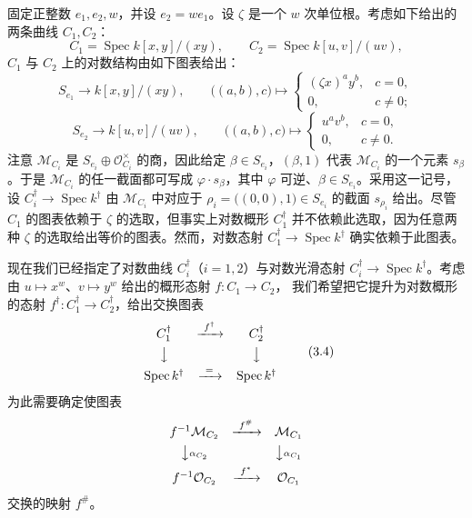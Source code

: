 \begin{example}
固定正整数 $e_1,e_2,w$，并设 $e_2=we_1$。设 $\zeta$ 是一个 $w$ 次单位根。考虑如下给出的两条曲线 $C_1,C_2$：
\[
  C_1=\operatorname{Spec} k[x,y]/(xy),\qquad
  C_2=\operatorname{Spec} k[u,v]/(uv),
\]
$C_1$ 与 $C_2$ 上的对数结构由如下图表给出：
\[
  S_{e_1}\longrightarrow k[x,y]/(xy),\qquad
  \bigl((a,b),c\bigr)\longmapsto
  \begin{cases}
    (\zeta x)^a y^b, & c=0,\\
    0, & c\neq0;
  \end{cases}
\]
\[
  S_{e_2}\longrightarrow k[u,v]/(uv),\qquad
  \bigl((a,b),c\bigr)\longmapsto
  \begin{cases}
    u^a v^b, & c=0,\\
    0, & c\neq0.
  \end{cases}
\]
注意 $\mathcal{M}_{C_i}$ 是 $S_{e_i}\oplus\mathcal{O}_{C_i}^{\times}$ 的商，因此给定 $\beta\in S_{e_i}$，$(\beta,1)$ 代表 $\mathcal{M}_{C_i}$ 的一个元素 $s_{\beta}$。于是 $\mathcal{M}_{C_i}$ 的任一截面都可写成 $\varphi\cdot s_{\beta}$，其中 $\varphi$ 可逆、$\beta\in S_{e_i}$。采用这一记号，设 $C_i^{\dagger}\to\operatorname{Spec} k^{\dagger}$ 由 $\mathcal{M}_{C_i}$ 中对应于 $\rho_i=\bigl((0,0),1\bigr)\in S_{e_i}$ 的截面 $s_{\rho_i}$ 给出。尽管 $C_1$ 的图表依赖于 $\zeta$ 的选取，但事实上对数概形 $C_1^{\dagger}$ 并不依赖此选取，因为任意两种 $\zeta$ 的选取给出等价的图表。然而，对数态射 $C_1^{\dagger}\to\operatorname{Spec} k^{\dagger}$ 确实依赖于此图表。

现在我们已经指定了对数曲线 $C_i^{\dagger}$（$i=1,2$）与对数光滑态射 $C_i^{\dagger}\to\operatorname{Spec} k^{\dagger}$。考虑由 $u\mapsto x^w$、$v\mapsto y^w$ 给出的概形态射 $f:C_1\to C_2$，
我们希望把它提升为对数概形的态射 $f^{\dagger}:C_1^{\dagger}\to C_2^{\dagger}$，给出交换图表
\begin{equation}
\begin{array}{ccc}
  C_1^{\dagger} & \xrightarrow{\ f^{\dagger}\ } & C_2^{\dagger}\\[4pt]
  \big\downarrow & & \big\downarrow\\[4pt]
  \operatorname{Spec} k^{\dagger} & \xrightarrow{\ =\ } & \operatorname{Spec} k^{\dagger}
\end{array}
\tag{3.4}
\end{equation}
为此需要确定使图表
\[
\begin{array}{ccc}
  f^{-1}\mathcal{M}_{C_2} & \xrightarrow{\ f^{\#}\ } & \mathcal{M}_{C_1}\\[4pt]
  \big\downarrow\scriptstyle{\alpha_{C_2}} & & \big\downarrow\scriptstyle{\alpha_{C_1}}\\[4pt]
  f^{-1}\mathcal{O}_{C_2} & \xrightarrow{\ f^{*}\ } & \mathcal{O}_{C_1}
\end{array}
\]
交换的映射 $f^{\#}$。


\end{example}

